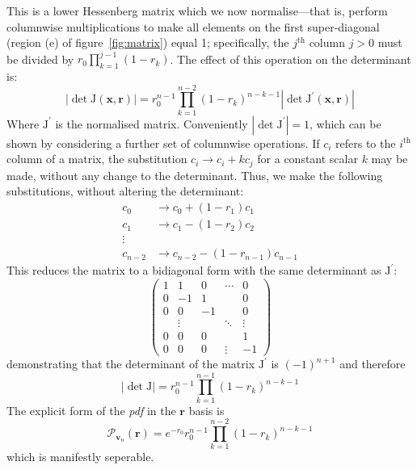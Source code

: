 \documentclass[aps,prl,twocolumn]{revtex4}
\renewcommand{\vec}[1]{\mathbf{#1}}
\newcommand{\mat}[1]{\mathrm{#1}}
\newcommand{\of}[1]{\!\left(#1\right)}
\newcommand{\pdf}{{\it pdf}}
\newcommand{\abs}[1]{\left|#1\right|}
\newcommand{\prob}[1]{\mathcal{#1}}
\begin{document}
This is a lower Hessenberg matrix which we now normalise---that is, perform
columnwise multiplications to make all elements on the first super-diagonal
(region (e) of figure~\ref{fig:matrix}) equal 1;
specifically, the \(j^{\text{th}}\) column \( j>0 \) must be divided by \( r_0
\prod_{k=1}^{j-1} \left( 1-r_k \right) \). The effect of this operation on the
determinant is:
\begin{equation}
  \abs{ \det \mat{J} \of{ \vec{x}, \vec{r} }} = r_0^{n-1} \prod_{k=1}^{n-2}
  \left( 1-r_k \right)^{n-k-1} \abs{ \det \mat{J}^{\prime} \of{ \vec{x}, \vec{r}
  } }
\end{equation}
Where \( \mat{J}^{\prime} \) is the normalised matrix. Conveniently \( \abs{
\det \mat{J}^{\prime} }=1 \), which can be shown by considering a further set of
columnwise operations. If \( c_i \) refers to the \( i^{\text{th}} \) column of
a matrix, the substitution \( c_i \rightarrow c_i + k c_j \) for a constant
scalar \(k\) may be made, without any change to the determinant. Thus, we make
the following substitutions, without altering the determinant:
\begin{align*}
  c_0 &\rightarrow c_0 + \left( 1-r_1 \right) c_1 \\
  c_1 &\rightarrow c_1 - \left( 1-r_2 \right) c_2 \\
  \vdots \\
  c_{n-2} &\rightarrow c_{n-2} - \left( 1-r_{n-1} \right) c_{n-1}
\end{align*}
This reduces the matrix to a bidiagonal form with the same determinant as \(
\mat{J}^{\prime} \):
\begin{equation*}
  \begin{pmatrix}
    1 & 1 & 0 & \cdots & 0 \\
    0 & -1 & 1 & & 0 \\
    0 & 0 & -1 & & 0 \\
    & \vdots & & \ddots & \vdots \\
    0 & 0 & 0 & & 1 \\
    0 & 0 & 0 & \vdots & -1 
  \end{pmatrix}
\end{equation*}
demonstrating that the determinant of the matrix \( \mat{J}^{\prime} \) is \(
\left( -1 \right)^{n+1} \) and therefore
\begin{equation}
  \abs{ \det \mat{J} } = r_0^{n-1} \prod_{k=1}^{n-1} \left( 1-r_k
  \right)^{n-k-1}
\end{equation}
The explicit form of the \pdf{ } in the \(\vec{r}\) basis is
\begin{equation}
  \prob{P}_{\vec{v}_n} \of{ \vec{r} } = e^{-r_0} r_0^{n-1} \prod_{k=1}^{n-2}
  \left( 1-r_k \right)^{n-k-1}
\end{equation}
which is manifestly seperable.
\end{document}
